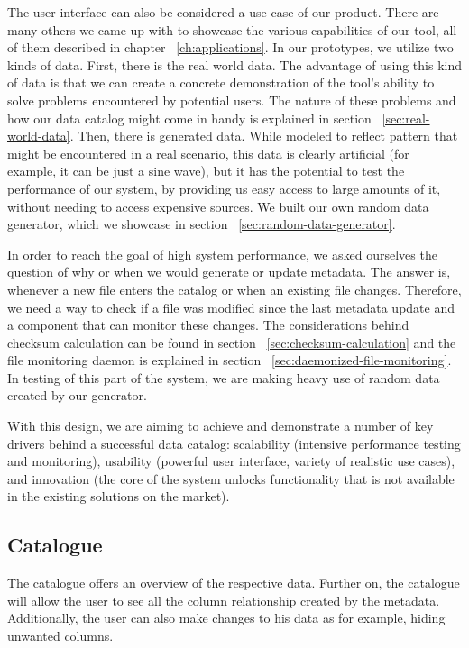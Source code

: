 The user interface can also be considered a use case of our product.
There are many others we came up with to showcase the various capabilities of our tool, all of them described in chapter
~\ref{ch:applications}.
In our prototypes, we utilize two kinds of data.
First, there is the real world data.
The advantage of using this kind of data is that we can create a concrete demonstration of the tool's ability to solve problems
encountered by potential users.
The nature of these problems and how our data catalog might come in handy is explained in section ~\ref{sec:real-world-data}.
Then, there is generated data.
While modeled to reflect pattern that might be encountered in a real scenario, this data is clearly artificial (for example,
it can be just a sine wave), but it has the potential to test the performance of our system, by providing us easy access
to large amounts of it, without needing to access expensive sources.
We built our own random data generator, which we showcase in section ~\ref{sec:random-data-generator}.

In order to reach the goal of high system performance, we asked ourselves the question of why or when we would generate or
update metadata.
The answer is, whenever a new file enters the catalog or when an existing file changes.
Therefore, we need a way to check if a file was modified since the last metadata update and a component that can monitor
these changes.
The considerations behind checksum calculation can be found in section ~\ref{sec:checksum-calculation} and the file monitoring
daemon is explained in section ~\ref{sec:daemonized-file-monitoring}.
In testing of this part of the system, we are making heavy use of random data created by our generator.

With this design, we are aiming to achieve and demonstrate a number of key drivers behind a successful data catalog: scalability
(intensive performance testing and monitoring), usability (powerful user interface, variety of realistic use cases), and
innovation (the core of the system unlocks functionality that is not available in the existing solutions on the market).

\vspace{5mm} %
\subsection{Catalogue}
The catalogue offers an overview of the respective data. Further on, the catalogue will allow the user to see all the column relationship created by the metadata. Additionally, the user can also make changes to his data as for example, hiding unwanted columns.
\vspace{5mm} %
